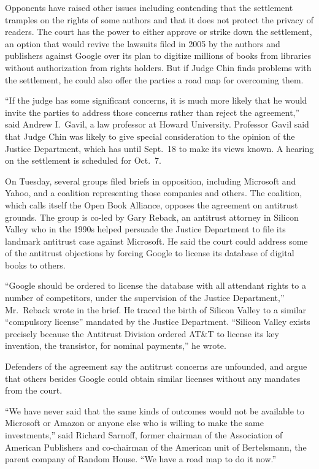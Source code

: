 ﻿\documentclass[12pt]{article}
\begin{document}
Opponents have raised other issues including contending that the settlement tramples on the rights
of some authors and that it does not protect the privacy of readers. The court has the power to
either approve or strike down the settlement, an option that would revive the lawsuits filed in 2005
by the authors and publishers against Google over its plan to digitize millions of books from
libraries without authorization from rights holders. But if Judge Chin finds problems with the
settlement, he could also offer the parties a road map for overcoming them.

``If the judge has some significant concerns, it is much more likely that he would invite the
parties to address those concerns rather than reject the agreement,'' said Andrew I.~Gavil, a law
professor at Howard University. Professor Gavil said that Judge Chin was likely to give special
consideration to the opinion of the Justice Department, which has until Sept.~18 to make its views
known. A hearing on the settlement is scheduled for Oct.~7.

On Tuesday, several groups filed briefs in opposition, including Microsoft and Yahoo, and a
coalition representing those companies and others. The coalition, which calls itself the Open Book
Alliance, opposes the agreement on antitrust grounds. The group is co-led by Gary Reback, an
antitrust attorney in Silicon Valley who in the 1990s helped persuade the Justice Department to file
its landmark antitrust case against Microsoft. He said the court could address some of the antitrust
objections by forcing Google to license its database of digital books to others.

``Google should be ordered to license the database with all attendant rights to a number of
competitors, under the supervision of the Justice Department,'' Mr.~Reback wrote in the brief. He
traced the birth of Silicon Valley to a similar ``compulsory license'' mandated by the Justice
Department. ``Silicon Valley exists precisely because the Antitrust Division ordered AT\&T to
license its key invention, the transistor, for nominal payments,'' he wrote.

Defenders of the agreement say the antitrust concerns are unfounded, and argue that others besides
Google could obtain similar licenses without any mandates from the court.

``We have never said that the same kinds of outcomes would not be available to Microsoft or Amazon
or anyone else who is willing to make the same investments,'' said Richard Sarnoff, former chairman
of the Association of American Publishers and co-chairman of the American unit of Bertelsmann, the
parent company of Random House. ``We have a road map to do it now.''
\end{document}
